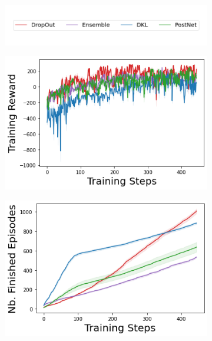 \begin{figure}
    \centering
        \begin{subfigure}{.5\textwidth}
        \includegraphics[width=\textwidth]{sections/011_icml2022/resources/legend.png}
    \end{subfigure}
    \vspace{-5mm}
    
    \begin{subfigure}{.245\textwidth}
        \includegraphics[width=\textwidth]{sections/011_icml2022/resources/lunarlander-training_total_reward-training-model.png}
    \end{subfigure}
    \begin{subfigure}{.245\textwidth}
        \includegraphics[width=\textwidth]{sections/011_icml2022/resources/lunarlander-n_finished_training_episodes-training-model.png}  

\end{subfigure}
\end{figure}
